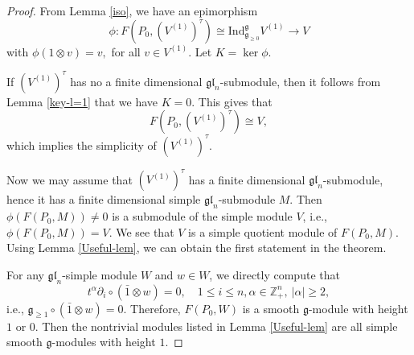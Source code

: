 \documentclass[12pt, a4paper]{amsart}
\newcommand{\fg}{\mathfrak g}
\newcommand{\C}{\mathbb{C}}
\newcommand{\Z}{\mathbb Z}
\theoremstyle{Theorem}
\theoremstyle{Theorem}
\numberwithin{equation}{section}
\begin{document}
\begin{proof}From Lemma \ref{iso}, we have an epimorphism
\[\phi: F(P_{0},(V^{(1)})^\tau)\cong\mathrm{Ind}_{\fg_{\ge 0}}^{\fg}V^{(1)}\rightarrow V\]
with $\phi(1\otimes v)=v,$ for all $v\in V^{(1)}$. Let $K=\ker \phi$.

If  $(V^{(1)})^\tau$
	has no a finite dimensional $\mathfrak{gl}_n$-submodule, then it follows from Lemma \ref{key-l=1} that we have $K=0$.
This gives that \[F(P_{0}, (V^{(1)})^\tau)\cong V,\]
which implies the simplicity of $(V^{(1)})^\tau$. 

Now we may assume that $(V^{(1)})^\tau$
has a finite dimensional $\mathfrak{gl}_n$-submodule, hence it has a finite dimensional simple $\mathfrak{gl}_n$-submodule $M$.
Then $\phi(F(P_{0},M))\ne 0$ is a submodule of the simple module $V$, i.e.,
$\phi(F(P_{0},M))=V$. We see that $V$ is a simple quotient module of $F(P_{0},M)$.  Using Lemma \ref{Useful-lem}, we can obtain the first statement in the theorem.

For any $\mathfrak{gl}_n$-simple module $W$ and $w \in W$, we directly compute that \[t^{\alpha}\partial_{i}\circ(\bar{1}\otimes w)=0,\quad   1\leq i\leq n, \alpha\in\Z_{+}^{n},\ |\alpha|\geq2,\]
	i.e., $\mathfrak{g}_{\geq1}\circ(\bar{1}\otimes w)=0$. 
	Therefore, $F(P_{0}, W)$ is a smooth $\fg$-module with height $1$ or $0$. Then the nontrivial modules listed in Lemma \ref{Useful-lem} are all simple smooth $\fg$-modules with height $1$.
\end{proof}

 

\end{document}

